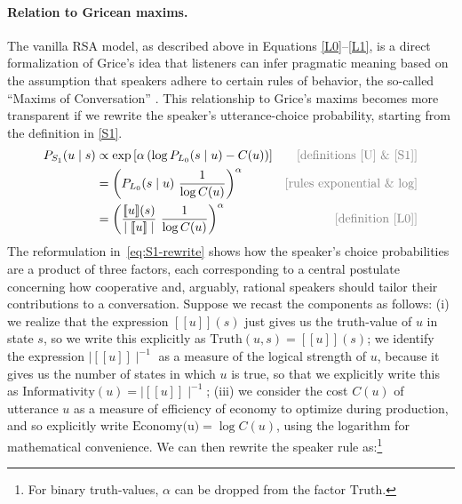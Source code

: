 \documentclass{sp}
\newcommand{\sem}[1]{\ensuremath{[\![#1]\!]}}
\begin{document}
\paragraph{Relation to Gricean maxims.} The vanilla RSA model, as described above in Equations
\eqref{L0}--\eqref{L1}, is a direct formalization of Grice's idea that listeners can infer
pragmatic meaning based on the assumption that speakers adhere to certain rules of behavior,
the so-called ``Maxims of Conversation'' \citep{Grice1975:Logic-and-Conve}. This relationship to Grice's maxims becomes more
transparent if we rewrite the speaker's utterance-choice probability, starting from the
definition in \eqref{S1}.
%
\begin{align} \label{eq:S1-rewrite}
  P_{S_1}(u\mid s) & \propto \exp \left [ \alpha \left (\log P_{L_0}(s \mid u) - C(u) \right)  \right ] & \text{\textcolor{gray}{[definitions \eqref{U} \& \eqref{S1}]}} \\
  & = \left (P_{L_0}(s \mid u) \  \frac{1}{\log C(u)} \right)^{\alpha} & \text{\textcolor{gray}{[rules exponential \& log]}} \nonumber \\
  & = \left ( \frac{\sem{u}(s)}{\mid  \sem{u} \mid } \ \frac{1}{\log C(u)} \right )^{\alpha} & \text{\textcolor{gray}{[definition \eqref{L0}]}} \nonumber
\end{align}
%
The reformulation in~\eqref{eq:S1-rewrite} shows how the speaker's choice probabilities are a
product of three factors, each corresponding to a central postulate concerning how cooperative and, arguably, rational speakers should tailor their contributions
to a conversation. Suppose we recast the components as follows: (i) we realize that the expression $\sem{u}(s)$ just gives us the truth-value of $u$ in state $s$, so we write this explicitly as 
$\text{Truth}(u,s) = \sem{u}(s)$; we identify the expression $\mid \sem{u}\mid ^{-1}$ as a measure of the logical strength of $u$, because it gives us the number of states in which $u$ is true, so that we explicitly write this as  $\text{Informativity}(u) = \mid \sem{u}\mid ^{-1}$; (iii) we consider the cost $C(u)$ of utterance $u$ as a measure of efficiency of economy to optimize during production, and so explicitly write $\text{Economy(u)} = \log C(u)$, using the logarithm for mathematical convenience. We can then rewrite the speaker rule as:\footnote{For
binary truth-values, $\alpha$ can be dropped from the factor $\text{Truth}$.}
\end{document}

